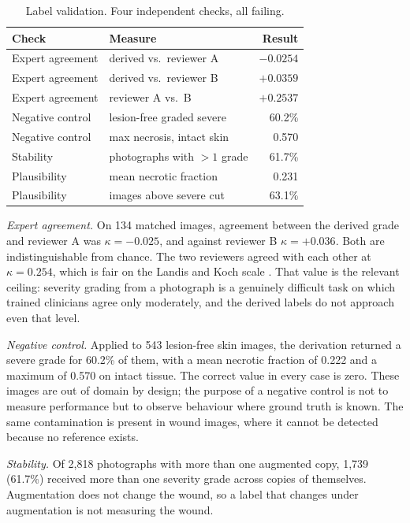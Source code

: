 \begin{table}[!t]
\caption{Label validation. Four independent checks, all failing.}
\label{tab:validation}
\centering
\small
\begin{tabular}{@{}llr@{}}
\toprule
Check & Measure & Result \\
\midrule
Expert agreement & derived vs.\ reviewer A & $-0.0254$ \\
Expert agreement & derived vs.\ reviewer B & $+0.0359$ \\
Expert agreement & reviewer A vs.\ B       & $+0.2537$ \\
\midrule
Negative control & lesion-free graded severe & 60.2\% \\
Negative control & max necrosis, intact skin & 0.570 \\
\midrule
Stability & photographs with $>1$ grade & 61.7\% \\
\midrule
Plausibility & mean necrotic fraction     & 0.231 \\
Plausibility & images above severe cut    & 63.1\% \\
\bottomrule
\end{tabular}
\end{table}

\emph{Expert agreement.} On 134 matched images, agreement between the
derived grade and reviewer A was $\kappa = -0.025$, and against reviewer B
$\kappa = +0.036$. Both are indistinguishable from chance. The two
reviewers agreed with each other at $\kappa = 0.254$, which is fair on the
Landis and Koch scale \cite{landis1977}. That value is the relevant
ceiling: severity grading from a photograph is a genuinely difficult task
on which trained clinicians agree only moderately, and the derived labels
do not approach even that level.

\emph{Negative control.} Applied to 543 lesion-free skin images, the
derivation returned a severe grade for 60.2\% of them, with a mean necrotic
fraction of 0.222 and a maximum of 0.570 on intact tissue. The correct
value in every case is zero. These images are out of domain by design; the
purpose of a negative control is not to measure performance but to observe
behaviour where ground truth is known. The same contamination is present in
wound images, where it cannot be detected because no reference exists.

\emph{Stability.} Of 2{,}818 photographs with more than one augmented copy,
1{,}739 (61.7\%) received more than one severity grade across copies of
themselves. Augmentation does not change the wound, so a label that changes
under augmentation is not measuring the wound.

